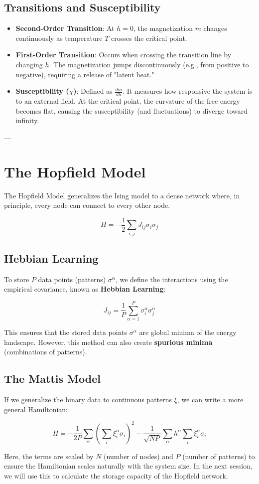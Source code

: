 \subsection{Transitions and Susceptibility}
\begin{itemize}
    \item \textbf{Second-Order Transition}: At $h=0$, the magnetization $m$ changes continuously as temperature $T$ crosses the critical point.
    \item \textbf{First-Order Transition}: Occurs when crossing the transition line by changing $h$. The magnetization jumps discontinuously (e.g., from positive to negative), requiring a release of "latent heat."
    \item \textbf{Susceptibility ($\chi$)}: Defined as $\frac{dm}{dh}$. It measures how responsive the system is to an external field. At the critical point, the curvature of the free energy becomes flat, causing the susceptibility (and fluctuations) to diverge toward infinity.
\end{itemize}

---

\section{The Hopfield Model}
The Hopfield Model generalizes the Ising model to a dense network where, in principle, every node can connect to every other node.

\[ H = -\frac{1}{2} \sum_{i,j} J_{ij} \sigma_i \sigma_j \]

\subsection{Hebbian Learning}
To store $P$ data points (patterns) $\sigma^\alpha$, we define the interactions using the empirical covariance, known as \textbf{Hebbian Learning}:

\[ J_{ij} = \frac{1}{P} \sum_{\alpha=1}^P \sigma_i^\alpha \sigma_j^\alpha \]

This ensures that the stored data points $\sigma^\alpha$ are global minima of the energy landscape. However, this method can also create \textbf{spurious minima} (combinations of patterns).

\subsection{The Mattis Model}
If we generalize the binary data to continuous patterns $\xi$, we can write a more general Hamiltonian:

\[ H = -\frac{1}{2P} \sum_{\alpha} \left( \sum_i \xi_i^\alpha \sigma_i \right)^2 - \frac{1}{\sqrt{NP}} \sum_\alpha h^\alpha \sum_i \xi_i^\alpha \sigma_i \]

Here, the terms are scaled by $N$ (number of nodes) and $P$ (number of patterns) to ensure the Hamiltonian scales naturally with the system size. In the next session, we will use this to calculate the storage capacity of the Hopfield network.


